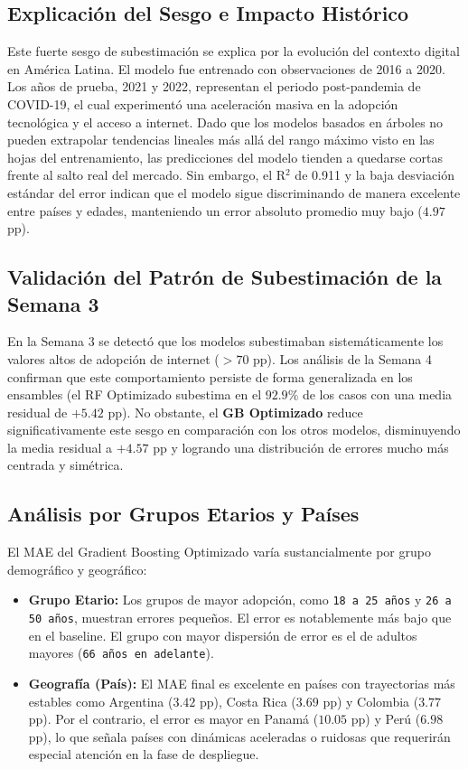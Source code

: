 \documentclass[12pt,a4paper]{article}
\begin{document}
\subsection{Explicación del Sesgo e Impacto Histórico}
Este fuerte sesgo de subestimación se explica por la evolución del contexto digital en América Latina. El modelo fue entrenado con observaciones de 2016 a 2020. Los años de prueba, 2021 y 2022, representan el periodo post-pandemia de COVID-19, el cual experimentó una aceleración masiva en la adopción tecnológica y el acceso a internet. Dado que los modelos basados en árboles no pueden extrapolar tendencias lineales más allá del rango máximo visto en las hojas del entrenamiento, las predicciones del modelo tienden a quedarse cortas frente al salto real del mercado. Sin embargo, el R$^2$ de 0.911 y la baja desviación estándar del error indican que el modelo sigue discriminando de manera excelente entre países y edades, manteniendo un error absoluto promedio muy bajo ($4.97$ pp).

\subsection{Validación del Patrón de Subestimación de la Semana 3}
En la Semana 3 se detectó que los modelos subestimaban sistemáticamente los valores altos de adopción de internet ($>70$ pp). Los análisis de la Semana 4 confirman que este comportamiento persiste de forma generalizada en los ensambles (el RF Optimizado subestima en el $92.9\%$ de los casos con una media residual de $+5.42$ pp). No obstante, el \textbf{GB Optimizado} reduce significativamente este sesgo en comparación con los otros modelos, disminuyendo la media residual a $+4.57$ pp y logrando una distribución de errores mucho más centrada y simétrica.

\subsection{Análisis por Grupos Etarios y Países}
El MAE del Gradient Boosting Optimizado varía sustancialmente por grupo demográfico y geográfico:
\begin{itemize}
    \item \textbf{Grupo Etario:} Los grupos de mayor adopción, como \texttt{18 a 25 años} y \texttt{26 a 50 años}, muestran errores pequeños. El error es notablemente más bajo que en el baseline. El grupo con mayor dispersión de error es el de adultos mayores (\texttt{66 años en adelante}).
    \item \textbf{Geografía (País):} El MAE final es excelente en países con trayectorias más estables como Argentina ($3.42$ pp), Costa Rica ($3.69$ pp) y Colombia ($3.77$ pp). Por el contrario, el error es mayor en Panamá ($10.05$ pp) y Perú ($6.98$ pp), lo que señala países con dinámicas aceleradas o ruidosas que requerirán especial atención en la fase de despliegue.
\end{itemize}
\end{document}

